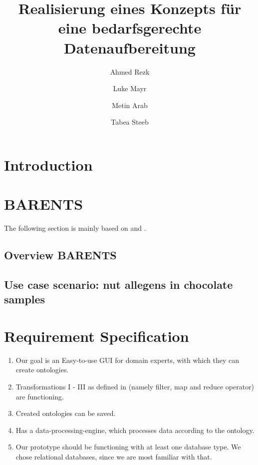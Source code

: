 \documentclass[sigconf]{acmart}
\begin{document}
\title{Realisierung eines Konzepts für eine bedarfsgerechte Datenaufbereitung}

\author{Ahmed Rezk}

\author{Luke Mayr}

\author{Metin Arab}

\author{Tabea Steeb}

\begin{abstract}
\end{abstract}


\maketitle

\section{Introduction}


\section{BARENTS}
The following section is mainly based on \cite{barents21} and \cite{barents22}.
\subsection{Overview BARENTS}
\subsection{Use case scenario: nut allegens in chocolate samples}


\section{Requirement Specification}
\begin{enumerate}
\item[(R1)] Our goal is an Easy-to-use GUI for domain experts, with which they can create ontologies.
\item[(R2)] Transformations I - III as defined in \cite{barents21} (namely filter, map and reduce operator) are functioning.
\item[(R3)] Created ontologies can be saved.
\item[(R4)] Has a data-processing-engine, which processes data according to the ontology.
\item[(R5)] Our prototype should be functioning with at least one database type. We chose relational databases, since we are most familiar with that.
\end{enumerate}
\end{document}
